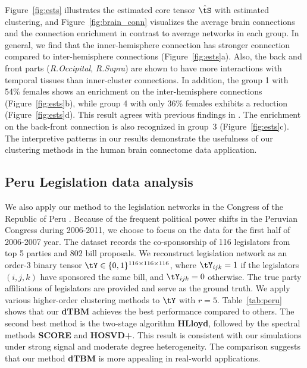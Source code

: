 \documentclass[lettersize,onecolumn,journal]{IEEEtran}
\theoremstyle{definition}
\theoremstyle{definition}
\begin{document}
Figure~\ref{fig:ests} illustrates the estimated core tensor $\hat \tS$ with estimated clustering, and Figure~\ref{fig:brain_conn} visualizes the average brain connections and the connection enrichment in contrast to average networks in each group. In general, we find that the inner-hemisphere connection has stronger connection compared to inter-hemisphere connections (Figure~\ref{fig:ests}a). Also, the back and front parts (\emph{R.Occipital}, \emph{R.Supra}) are shown to have more interactions with temporal tissues than inner-cluster connections. In addition, the group 1 with 54\% females shows an enrichment on the inter-hemisphere connections (Figure~\ref{fig:ests}b), while group 4 with only 36\% females exhibits a reduction (Figure~\ref{fig:ests}d). This result agrees with previous findings in \cite{hu2021generalized}. The enrichment on the back-front connection is also recognized in group~3 (Figure~\ref{fig:ests}c). The interpretive patterns in our results demonstrate the usefulness of our clustering methods in the human brain connectome data application. 


\subsection{Peru Legislation data analysis}

We also apply our method to the legislation networks in the Congress of the Republic of Peru \citep{lee2017time}. Because of the frequent political power shifts in the Peruvian Congress during 2006-2011, we choose to focus on the data for the first half of 2006-2007 year. The dataset records the co-sponsorship of 116 legislators from top 5 parties and 802 bill proposals. We reconstruct legislation network as an order-3 binary tensor $\tY \in \{0,1\}^{116 \times 116 \times 116}$, where $\tY_{ijk} = 1$ if the legislators $(i,j,k)$ have sponsored the same bill, and $\tY_{ijk} = 0$ otherwise. The true party affiliations of legislators are provided and serve as the ground truth. We apply various higher-order clustering methods to $\tY$ with $r = 5$. Table~\ref{tab:peru} shows that our \textbf{\small dTBM} achieves the best performance compared to others. The second best method is the two-stage algorithm \textbf{\small HLloyd}, followed by the spectral methods \textbf{\small SCORE} and \textbf{\small HOSVD+}. This result is consistent with our simulations under strong signal and moderate degree heterogeneity. The comparison suggests that our method \textbf{\small dTBM} is more appealing in real-world applications.
\end{document}
